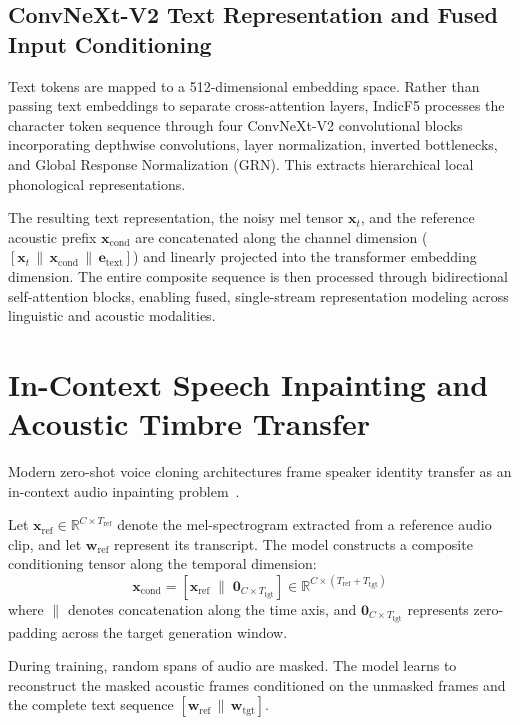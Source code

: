\subsection{ConvNeXt-V2 Text Representation and Fused Input Conditioning}
Text tokens are mapped to a 512-dimensional embedding space. Rather than passing text embeddings to separate cross-attention layers, IndicF5 processes the character token sequence through four ConvNeXt-V2 convolutional blocks incorporating depthwise convolutions, layer normalization, inverted bottlenecks, and Global Response Normalization (GRN). This extracts hierarchical local phonological representations. 

The resulting text representation, the noisy mel tensor $\mathbf{x}_t$, and the reference acoustic prefix $\mathbf{x}_{\text{cond}}$ are concatenated along the channel dimension ($[\mathbf{x}_t \,\|\, \mathbf{x}_{\text{cond}} \,\|\, \mathbf{e}_{\text{text}}]$) and linearly projected into the transformer embedding dimension. The entire composite sequence is then processed through bidirectional self-attention blocks, enabling fused, single-stream representation modeling across linguistic and acoustic modalities.

\section{In-Context Speech Inpainting and Acoustic Timbre Transfer}
Modern zero-shot voice cloning architectures frame speaker identity transfer as an in-context audio inpainting problem~\cite{le2023voicebox,e2tts2024}.

Let $\mathbf{x}_{\text{ref}} \in \mathbb{R}^{C \times T_{\text{ref}}}$ denote the mel-spectrogram extracted from a reference audio clip, and let $\mathbf{w}_{\text{ref}}$ represent its transcript. The model constructs a composite conditioning tensor along the temporal dimension:
\begin{equation}
    \mathbf{x}_{\text{cond}} = \left[ \mathbf{x}_{\text{ref}} \;\Big\|\; \mathbf{0}_{C \times T_{\text{tgt}}} \right] \in \mathbb{R}^{C \times (T_{\text{ref}} + T_{\text{tgt}})}
    \label{eq:conditioning_tensor}
\end{equation}
where $\|$ denotes concatenation along the time axis, and $\mathbf{0}_{C \times T_{\text{tgt}}}$ represents zero-padding across the target generation window.

During training, random spans of audio are masked. The model learns to reconstruct the masked acoustic frames conditioned on the unmasked frames and the complete text sequence $[\mathbf{w}_{\text{ref}} \,\|\, \mathbf{w}_{\text{tgt}}]$.

